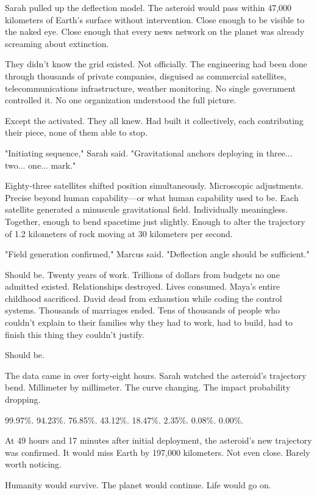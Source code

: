 Sarah pulled up the deflection model. The asteroid would pass within 47,000 kilometers of Earth's surface without intervention. Close enough to be visible to the naked eye. Close enough that every news network on the planet was already screaming about extinction.

They didn't know the grid existed. Not officially. The engineering had been done through thousands of private companies, disguised as commercial satellites, telecommunications infrastructure, weather monitoring. No single government controlled it. No one organization understood the full picture.

Except the activated. They all knew. Had built it collectively, each contributing their piece, none of them able to stop.

"Initiating sequence," Sarah said. "Gravitational anchors deploying in three... two... one... mark."

Eighty-three satellites shifted position simultaneously. Microscopic adjustments. Precise beyond human capability—or what human capability used to be. Each satellite generated a minuscule gravitational field. Individually meaningless. Together, enough to bend spacetime just slightly. Enough to alter the trajectory of 1.2 kilometers of rock moving at 30 kilometers per second.

"Field generation confirmed," Marcus said. "Deflection angle should be sufficient."

Should be. Twenty years of work. Trillions of dollars from budgets no one admitted existed. Relationships destroyed. Lives consumed. Maya's entire childhood sacrificed. David dead from exhaustion while coding the control systems. Thousands of marriages ended. Tens of thousands of people who couldn't explain to their families why they had to work, had to build, had to finish this thing they couldn't justify.

Should be.

The data came in over forty-eight hours. Sarah watched the asteroid's trajectory bend. Millimeter by millimeter. The curve changing. The impact probability dropping.

99.97\%.
94.23\%.
76.85\%.
43.12\%.
18.47\%.
2.35\%.
0.08\%.
0.00\%.

At 49 hours and 17 minutes after initial deployment, the asteroid's new trajectory was confirmed. It would miss Earth by 197,000 kilometers. Not even close. Barely worth noticing.

Humanity would survive. The planet would continue. Life would go on.

